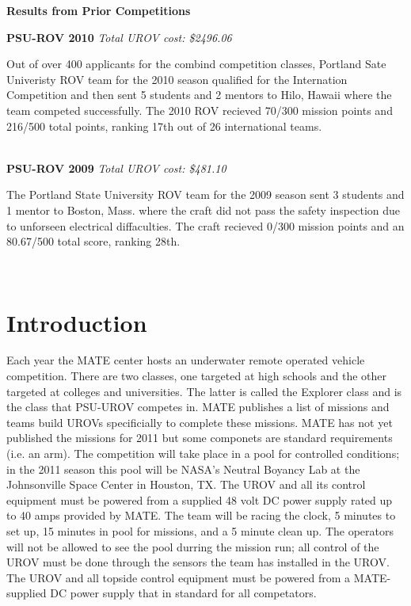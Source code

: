 \documentclass{proposalnsf}
\begin{document}
\centerline{\bf Results from Prior Competitions}

\noindent
{\bf PSU-ROV 2010}
{\it Total UROV cost: \$2496.06}

Out of over 400 applicants for the combind competition classes, Portland Sate Univeristy ROV team for the 2010 season qualified for the Internation Competition 
and then sent 5 students and 2 mentors to Hilo, Hawaii where the team competed successfully. The 2010 ROV recieved 70/300 mission points and 216/500 total points, 
ranking 17th out of 26 international teams.

\ \\
\noindent
{\bf PSU-ROV 2009}
{\it Total UROV cost: \$481.10}

The Portland State University ROV team for the 2009 season sent 3 students and 1 mentor to Boston, Mass. where the craft did not pass the safety inspection 
due to unforseen electrical diffaculties.  The craft recieved 0/300 mission points and an 80.67/500 total score, ranking 28th. 


\ \\

\section{Introduction}

Each year the MATE center hosts an underwater remote operated vehicle competition. There are two classes, one targeted at high schools and 
the other targeted at colleges and universities. The latter is called the Explorer class and is the class that PSU-UROV competes in. MATE 
publishes a list of missions and teams build UROVs specificially to complete these missions. MATE has not yet published the missions for 2011 
but some componets are standard requirements (i.e. an arm). The competition will take place in a pool for controlled conditions; in the 2011 
season this pool will be NASA's Neutral Boyancy Lab at the Johnsonville Space Center in Houston, TX. The UROV and all its control equipment 
must be powered from a supplied 48 volt DC power supply rated up to 40 amps provided by MATE. The team will be racing the clock, 
5 minutes to set up, 15 minutes in pool for missions, and a 5 minute clean up. The operators will not be allowed to see the pool durring the mission run; all 
control of the UROV must be done through the sensors the team has installed in the UROV. The UROV and all topside control equipment must be 
powered from a MATE-supplied DC power supply that in standard for all competators. 
\end{document}
